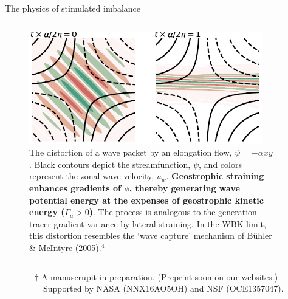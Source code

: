\documentclass[final]{beamer}
\begin{document}
\begin{frame}[t]
\begin{columns}[t]
\begin{column}{0.425\paperwidth}
{\begin{alertblock}{The physics of stimulated imbalance}
\begin{columns}
                \begin{column}{0.535\textwidth}
                  \vskip1.75cm
                  \begin{figure}
                    \includegraphics[width=0.95\textwidth]{figs/Gamma_a.pdf}
                    \caption{The distortion of a wave packet by an elongation flow,
                    $\psi = -\alpha xy$.
                    Black contours depict the
                    streamfunction, $\psi$, and colors represent the zonal wave velocity,
                    $u_w$.
                              \textbf{Geostrophic straining enhances gradients of $\phi$,
                              thereby generating wave potential energy at the expenses
                              of geostrophic kinetic energy ($\Gamma_a>0$)}. The
                              process is analogous to the generation tracer-gradient
                              variance by lateral straining. In the WBK limit, this
                              distortion resembles the `wave capture' mechanism of
                              B{\"u}hler \& McIntyre (2005).$^4$}
                  \end{figure}
                \end{column}

                \end{columns}
      \end{alertblock}
      }
      \vskip0.5cm
      ~~~~~~~$\dagger$ A manuscrupit in preparation. (Preprint soon on our websites.)\\
      ~~~~~~~~~Supported by NASA (NNX16AO5OH) and NSF (OCE1357047).
    \end{column}


    \hspace{1.cm}

    \begin{column}{0.55\textwidth}


\end{column}
\end{columns}
\end{frame}
\end{document}
